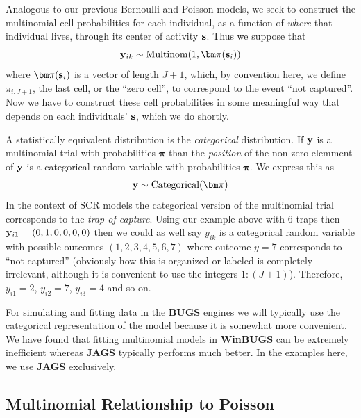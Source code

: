 {Analogous to our previous Bernoulli and Poisson models, we seek to
construct the multinomial cell probabilities for each individual, as a
function of {\it where} that individual lives, through its center of
activity ${\bf s}$. Thus we suppose that
\[
 {\bf y}_{ik} \sim \mbox{Multinom}(1, {\bm \pi}({\bf s}_{i}) )
\]
where ${\bm \pi}({\bf s}_{i})$ is a vector of length $J+1$, which, by
convention here, we define $\pi_{i,J+1}$, the last cell, or the ``zero
cell'', to correspond to the event ``not captured''.  Now we have to
construct these cell probabilities in some meaningful way that depends
on each individuals' ${\bf s}$, which we do shortly.

A statistically equivalent distribution is the {\it categorical} distribution.
If ${\bf y}$ is a multinomial trial with probabilities
${\bm \pi}$ than the {\it position} of the non-zero
elemment of ${\bf y}$ is a categorical random variable with probabilities
${\bm \pi}$.
We express this as
\[
{\bf y} \sim \mbox{Categorical}( {\bm \pi} )
\]
In the context of SCR models the categorical version of the
multinomial trial corresponds to the {\it trap of capture}.  Using our
example above with 6 traps then ${\bf y}_{i1} = (0,1,0,0,0,0)$ then we
could as well say $y_{ik}$ is a categorical random variable with
possible outcomes $(1,2,3,4,5,6,7)$ where outcome $y=7$ corresponds to
``not captured'' (obviously how this is organized or labeled is
completely irrelevant, although it is convenient to use the integers
$1:(J+1)$).  Therefore, $y_{i1} = 2$, $y_{i2} = 7$, $y_{i3} = 4$ and
so on.

For simulating and fitting data in the {\bf BUGS} engines we will typically use
the categorical representation of the model because it is somewhat
more convenient.  We have found that fitting multinomial models in
{\bf WinBUGS} can be extremely inefficient whereas {\bf JAGS}
typically performs much better. In the examples here, we use {\bf
  JAGS} exclusively.

\subsection{Multinomial Relationship to Poisson}

}

